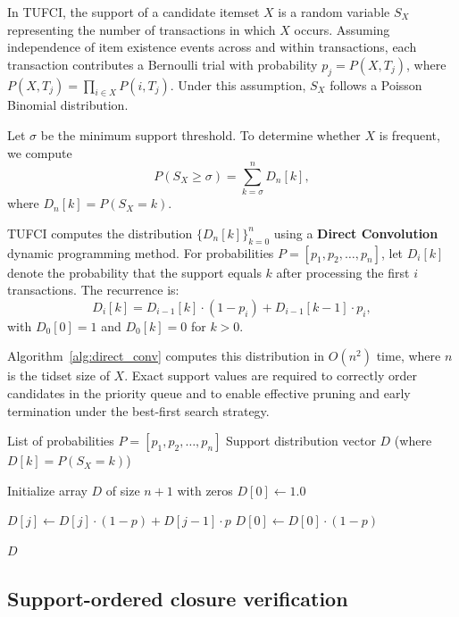 \documentclass[10pt,letterpaper]{article}
\begin{document}
In TUFCI, the support of a candidate itemset $X$ is a random variable $S_X$ representing the number of transactions in which $X$ occurs. Assuming independence of item existence events across and within transactions, each transaction contributes a Bernoulli trial with probability $p_j = P(X,T_j)$, where $P(X,T_j)=\prod_{i\in X}P(i,T_j)$. Under this assumption, $S_X$ follows a Poisson Binomial distribution.

Let $\sigma$ be the minimum support threshold. To determine whether $X$ is frequent, we compute
\[
P(S_X \ge \sigma) = \sum_{k=\sigma}^{n} D_n[k],
\]
where $D_n[k]=P(S_X=k)$.

TUFCI computes the distribution $\{D_n[k]\}_{k=0}^{n}$ using a \textbf{Direct Convolution} dynamic programming method. For probabilities $P=[p_1,p_2,\ldots,p_n]$, let $D_i[k]$ denote the probability that the support equals $k$ after processing the first $i$ transactions. The recurrence is:
\begin{equation}
D_i[k] = D_{i-1}[k]\cdot(1-p_i) + D_{i-1}[k-1]\cdot p_i,
\end{equation}
with $D_0[0]=1$ and $D_0[k]=0$ for $k>0$.

Algorithm~\ref{alg:direct_conv} computes this distribution in $O(n^2)$ time, where $n$ is the tidset size of $X$. Exact support values are required to correctly order candidates in the priority queue and to enable effective pruning and early termination under the best-first search strategy.



\begin{algorithm}[!h]
\caption{DirectConvolutionSupport}
\label{alg:direct_conv}
\begin{algorithmic}[1]
\small
\REQUIRE List of probabilities $P = [p_1, p_2, \ldots, p_n]$
\ENSURE Support distribution vector $D$ (where $D[k] = P(S_X=k)$)

\STATE Initialize array $D$ of size $n+1$ with zeros
\STATE $D[0] \leftarrow 1.0$ 

        \STATE $D[j] \leftarrow D[j] \cdot (1 - p) + D[j-1] \cdot p$
    \ENDFOR
    \STATE $D[0] \leftarrow D[0] \cdot (1 - p)$
\ENDFOR

\RETURN $D$
\end{algorithmic}
\end{algorithm}

\subsection*{Support-ordered closure verification}
\label{subsec:closure_verification}
\end{document}
